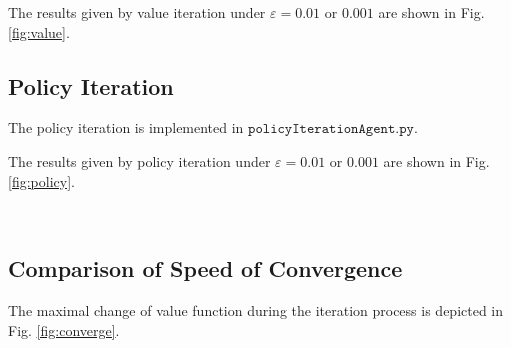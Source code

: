 \documentclass{article}
\begin{document}
    \hspace{-1.8em}
    The results given by value iteration under $\varepsilon=0.01$ or $0.001$ are shown in Fig. \ref{fig:value}. 

\subsection{Policy Iteration}
    The policy iteration is implemented in $\mathtt{policyIterationAgent.py}$.

    \hspace{-1.8em}
    The results given by policy iteration under $\varepsilon=0.01$ or $0.001$ are shown in Fig. \ref{fig:policy}.

    
    \begin{figure*}[htbp]
        \centering
        \\
        \caption{Value Iteration}
        \label{fig:value}
    \end{figure*}

    \begin{figure*}[htbp]
        \centering
        \caption{Policy Iteration}
        \label{fig:policy}
    \end{figure*}

\subsection{Comparison of Speed of Convergence}


The maximal change of value function during the iteration process is depicted in Fig. \ref{fig:converge}.
\end{document}
